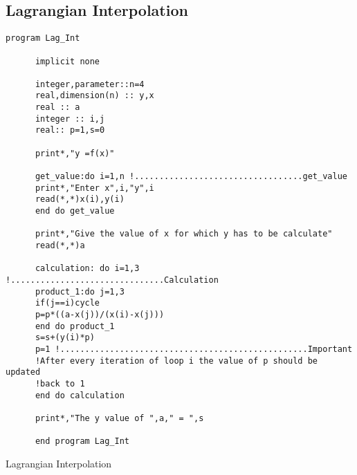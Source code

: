 \subsection{Lagrangian Interpolation}
\begin{listing}[ht!]
\begin{verbatim}
program Lag_Int

      implicit none

      integer,parameter::n=4
      real,dimension(n) :: y,x
      real :: a
      integer :: i,j
      real:: p=1,s=0

      print*,"y =f(x)"

      get_value:do i=1,n !..................................get_value
      print*,"Enter x",i,"y",i
      read(*,*)x(i),y(i) 
      end do get_value

      print*,"Give the value of x for which y has to be calculate"
      read(*,*)a

      calculation: do i=1,3 !...............................Calculation
      product_1:do j=1,3
      if(j==i)cycle
      p=p*((a-x(j))/(x(i)-x(j)))
      end do product_1
      s=s+(y(i)*p)
      p=1 !..................................................Important
      !After every iteration of loop i the value of p should be updated
      !back to 1
      end do calculation

      print*,"The y value of ",a," = ",s

      end program Lag_Int
\end{verbatim}
\caption{Lagrangian Interpolation}
\end{listing}
